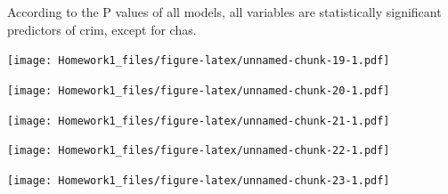 \documentclass[]{article}
\newenvironment{Shaded}{\begin{snugshade}}{\end{snugshade}}
\newcommand{\KeywordTok}[1]{\textcolor[rgb]{0.13,0.29,0.53}{\textbf{#1}}}
\newcommand{\OperatorTok}[1]{\textcolor[rgb]{0.81,0.36,0.00}{\textbf{#1}}}
\newcommand{\NormalTok}[1]{#1}
\begin{document}
According to the P values of all models, all variables are statistically
significant predictors of crim, except for chas.

\begin{Shaded}
\end{Shaded}

\texttt{[image: Homework1\_files/figure-latex/unnamed-chunk-19-1.pdf]}

\begin{Shaded}
\end{Shaded}

\texttt{[image: Homework1\_files/figure-latex/unnamed-chunk-20-1.pdf]}

\begin{Shaded}
\end{Shaded}

\texttt{[image: Homework1\_files/figure-latex/unnamed-chunk-21-1.pdf]}

\begin{Shaded}
\end{Shaded}

\texttt{[image: Homework1\_files/figure-latex/unnamed-chunk-22-1.pdf]}

\begin{Shaded}
\end{Shaded}

\texttt{[image: Homework1\_files/figure-latex/unnamed-chunk-23-1.pdf]}
\end{document}
